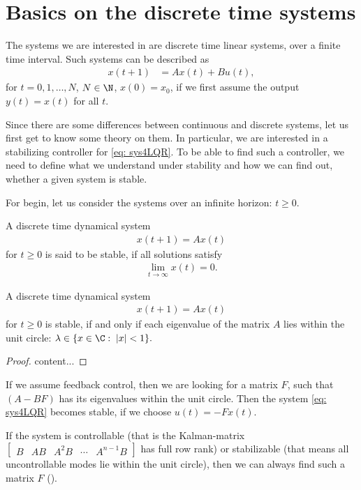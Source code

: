 \chapter{Basics on the discrete time systems}

The systems we are interested in are discrete time linear systems, over a finite time interval. Such systems can be described as 
\begin{align}
\label{eq: sys4LQR}
x(t+1) &= A x(t) + B u(t),
\end{align}
for $t = 0, 1, \dots, N$, $N \in \N$, $x(0) = x_0$, if we first assume the output $y(t) = x(t)$ for all $t$. 

Since there are some differences between continuous and discrete systems, let us first get to know some theory on them. In particular, we are interested in a stabilizing controller for \eqref{eq: sys4LQR}. To be able to find such a controller, we need to define what we understand under stability and how we can find out, whether a given system is stable. 

For begin, let us consider the systems over an infinite horizon: $t \geq 0$.
\begin{defi}
	A discrete time dynamical system
	\begin{align}
	x(t+1) = A x(t)
	\end{align}
	for $t \geq 0$ 
	is said to be stable, if all solutions satisfy 
	\begin{align}
	\lim_{t \to \infty} x(t) = 0.
	\end{align}	
\end{defi}
\begin{theo}
	A discrete time dynamical system 
	\begin{align}
	x(t+1) = A x(t)
	\end{align}
	for $t \geq 0$ 
	is stable, if and only if each eigenvalue of the matrix $A$ lies within the unit circle: $\lambda \in \{x \in \C: \; |x|<1\}.$
\end{theo}
\begin{proof}
	content...
\end{proof}

If we assume feedback control, then we are looking for a matrix $F$, such that $(A - BF)$ has its eigenvalues within the unit circle. Then the system \eqref{eq: sys4LQR} becomes stable, if we choose $u(t) = -Fx(t)$. 

If the system is controllable (that is the Kalman-matrix $\begin{bmatrix}
B & AB & A^2B & \cdots & A^{n-1}B
\end{bmatrix}$ has full row rank) or stabilizable (that means all uncontrollable modes lie within the unit circle), then we can always find such a matrix $F$ (\cite{LKT}). 


